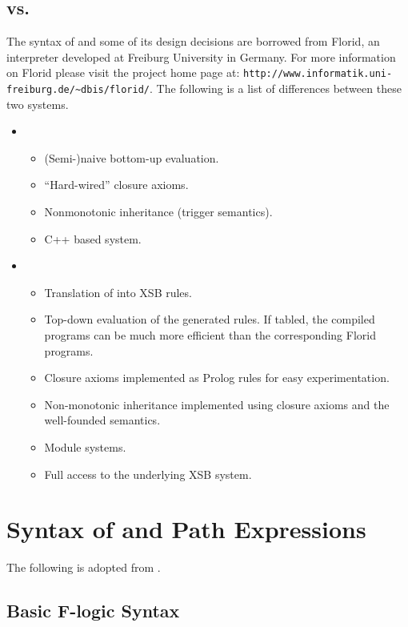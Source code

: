 \documentclass[11pt]{report}
\begin{document}
\subsection{\FLORA vs. \FLORID}

The syntax of \FLORA and some of its design decisions are borrowed from
Florid, an \fl interpreter developed at Freiburg University in Germany.
For more information on Florid please visit the project home page at:
\verb|http://www.informatik.uni-freiburg.de/~dbis/florid/|. The following
is a list of differences between these two systems.

\begin{itemize}
\item \FLORID
  \begin{itemize}
  \item (Semi-)naive bottom-up evaluation.
  \item ``Hard-wired'' closure axioms.
  \item Nonmonotonic inheritance (trigger semantics).
  \item C++ based system.
  \end{itemize}
\item \FLORA
  \begin{itemize}
  \item Translation of \fl into XSB rules.
  \item Top-down evaluation of the generated rules. If tabled, the compiled 
    programs can be much more efficient than the corresponding Florid
    programs.
  \item Closure axioms implemented as Prolog rules for easy experimentation.
  \item Non-monotonic inheritance implemented using closure axioms and the
    well-founded semantics.
  \item Module systems.
  \item Full access to the underlying XSB system.
  \end{itemize}
\end{itemize}



\section{Syntax of \FLORA and Path Expressions }

The following is adopted from \cite{ludaescher-himmeroeder-IS-98}.


\subsection{Basic F-logic Syntax}\label{sec-basic-flogic}
\end{document}
